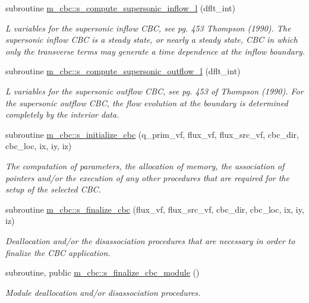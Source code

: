 \begin{DoxyCompactItemize}
subroutine \hyperlink{namespacem__cbc_aef459892802977978a425cd85648c706}{m\+\_\+cbc\+::s\+\_\+compute\+\_\+supersonic\+\_\+inflow\+\_\+l} (dflt\+\_\+int)
\begin{DoxyCompactList}\small\item\em L variables for the supersonic inflow C\+BC, see pg. 453 Thompson (1990). The supersonic inflow C\+BC is a steady state, or nearly a steady state, C\+BC in which only the transverse terms may generate a time dependence at the inflow boundary. \end{DoxyCompactList}\item 
subroutine \hyperlink{namespacem__cbc_a95f3cad9b9fec4f08b561da8f0db6584}{m\+\_\+cbc\+::s\+\_\+compute\+\_\+supersonic\+\_\+outflow\+\_\+l} (dflt\+\_\+int)
\begin{DoxyCompactList}\small\item\em L variables for the supersonic outflow C\+BC, see pg. 453 of Thompson (1990). For the supersonic outflow C\+BC, the flow evolution at the boundary is determined completely by the interior data. \end{DoxyCompactList}\item 
subroutine \hyperlink{namespacem__cbc_a50fed863b4ee14bf81590ed80154b539}{m\+\_\+cbc\+::s\+\_\+initialize\+\_\+cbc} (q\+\_\+prim\+\_\+vf, flux\+\_\+vf, flux\+\_\+src\+\_\+vf, cbc\+\_\+dir, cbc\+\_\+loc, ix, iy, iz)
\begin{DoxyCompactList}\small\item\em The computation of parameters, the allocation of memory, the association of pointers and/or the execution of any other procedures that are required for the setup of the selected C\+BC. \end{DoxyCompactList}\item 
subroutine \hyperlink{namespacem__cbc_a3fcf7cde1a04a7ee72ced4aa62cf53d0}{m\+\_\+cbc\+::s\+\_\+finalize\+\_\+cbc} (flux\+\_\+vf, flux\+\_\+src\+\_\+vf, cbc\+\_\+dir, cbc\+\_\+loc, ix, iy, iz)
\begin{DoxyCompactList}\small\item\em Deallocation and/or the disassociation procedures that are necessary in order to finalize the C\+BC application. \end{DoxyCompactList}\item 
subroutine, public \hyperlink{namespacem__cbc_a76b737dff5c827677888ffde0aff9cf1}{m\+\_\+cbc\+::s\+\_\+finalize\+\_\+cbc\+\_\+module} ()
\begin{DoxyCompactList}\small\item\em Module deallocation and/or disassociation procedures. \end{DoxyCompactList}\end{DoxyCompactItemize}
